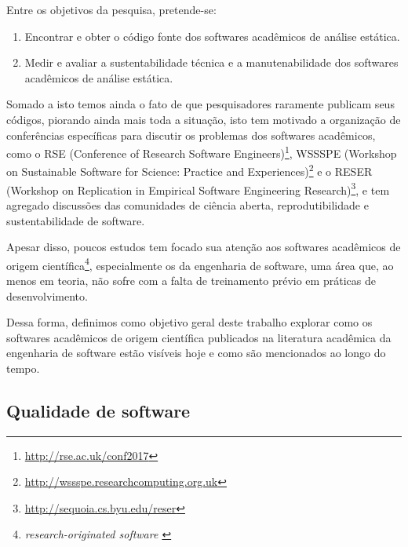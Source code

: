 Entre os objetivos da pesquisa, pretende-se:

\begin{enumerate}
  \item Encontrar e obter o código fonte dos softwares acadêmicos de análise
        estática.
  \item Medir e avaliar a sustentabilidade técnica e a manutenabilidade dos
        softwares acadêmicos de análise estática.
\end{enumerate}

Somado a isto temos ainda o fato de que pesquisadores raramente publicam seus
códigos, piorando ainda mais toda a situação, isto tem motivado a organização
de conferências específicas para discutir os problemas dos softwares
acadêmicos, como o RSE (Conference of Research Software Engineers)\footnote{
\url{http://rse.ac.uk/conf2017}}, WSSSPE (Workshop on Sustainable Software for
Science: Practice and Experiences)\footnote{
\url{http://wssspe.researchcomputing.org.uk}} e o RESER (Workshop on
Replication in Empirical Software Engineering Research)\footnote{
\url{http://sequoia.cs.byu.edu/reser}}, e tem agregado discussões das
comunidades de ciência aberta, reprodutibilidade e sustentabilidade de
software.

Apesar disso, poucos estudos tem focado sua atenção aos softwares acadêmicos de
origem científica\footnote{\it research-originated software \cite{Kon2011}},
especialmente os da engenharia de software, uma área que, ao menos em teoria,
não sofre com a falta de treinamento prévio em práticas de desenvolvimento.

Dessa forma, definimos como objetivo geral deste trabalho explorar como os
softwares acadêmicos de origem científica publicados na literatura acadêmica da
engenharia de software estão visíveis hoje e como são mencionados ao longo do
tempo.


\subsection{Qualidade de software}

%
%

